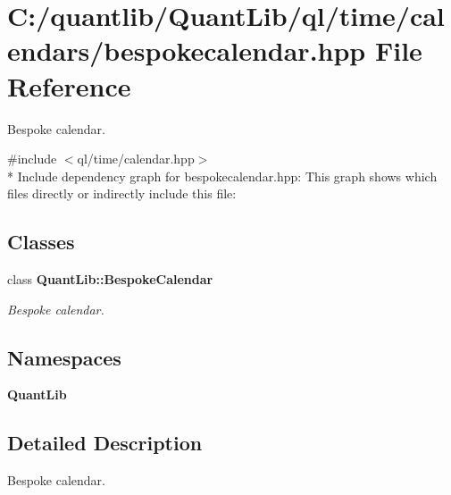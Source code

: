 \section{C\+:/quantlib/\+Quant\+Lib/ql/time/calendars/bespokecalendar.hpp File Reference}
\label{bespokecalendar_8hpp}


Bespoke calendar.  


{\ttfamily \#include $<$ql/time/calendar.\+hpp$>$}\\*
Include dependency graph for bespokecalendar.\+hpp\+:
This graph shows which files directly or indirectly include this file\+:
\subsection*{Classes}
\begin{DoxyCompactItemize}
\item 
class {\bf Quant\+Lib\+::\+Bespoke\+Calendar}
\begin{DoxyCompactList}\small\item\em Bespoke calendar. \end{DoxyCompactList}\end{DoxyCompactItemize}
\subsection*{Namespaces}
\begin{DoxyCompactItemize}
\item 
 {\bf Quant\+Lib}
\end{DoxyCompactItemize}


\subsection{Detailed Description}
Bespoke calendar. 

